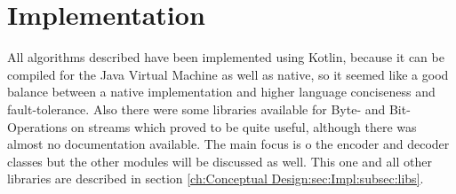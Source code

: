 \chapter{Implementation}
\label{ch:Implementation}
All algorithms described have been implemented using Kotlin, because it can be compiled for the Java Virtual Machine as well as native, so it seemed like a good balance between a native implementation and higher language conciseness and fault-tolerance. Also there were some libraries available for Byte- and Bit-Operations on streams which proved to be quite useful, although there was almost no documentation available. The main focus is o the encoder and decoder classes but the other modules will be discussed as well. This one and all other libraries are described in section \ref{ch:Conceptual Design:sec:Impl:subsec:libs}.

